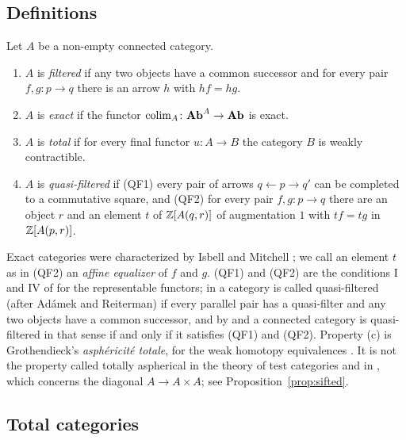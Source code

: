 \subsection{Definitions}

\begin{definition}\label{def:classes}
Let $A$ be a non-empty connected category.
\begin{enumerate}
\item[\textup{(a)}] $A$ is \emph{filtered} if any two objects have a common
 successor and for every pair $f,g\colon p\to q$ there is an arrow $h$ with
 $hf=hg$.
\item[\textup{(b)}] $A$ is \emph{exact} if the functor $\operatorname{colim}_A\colon\mathbf{Ab}^A\to\mathbf{Ab}$ is
 exact.
\item[\textup{(c)}] $A$ is \emph{total} if for every final functor $u\colon A\to B$
 the category $B$ is weakly contractible.
\item[\textup{(d)}] $A$ is \emph{quasi-filtered} if \textup{(QF1)} every pair of
 arrows $q\leftarrow p\to q'$ can be completed to a commutative square, and
 \textup{(QF2)} for every pair $f,g\colon p\to q$ there are an object $r$ and
 an element $t$ of $\mathbb{Z}[A(q,r)]$ of augmentation $1$ with $tf=tg$ in
 $\mathbb{Z}[A(p,r)]$.
\end{enumerate}
\end{definition}

Exact categories were characterized by Isbell and Mitchell
\cite{IM73,IM76}; we call an element $t$ as in (QF2) an \emph{affine
equalizer} of $f$ and $g$. (QF1) and (QF2) are the conditions I and IV of
\cite[\S 2]{IM76} for the representable functors; in \cite[p.~369]{AKR} a
category is called quasi-filtered (after Ad\'amek and Reiterman) if every
parallel pair has a quasi-filter and any two objects have a common successor,
and by \cite[\AKRone]{AKR} and \cite[Lemma~2.1]{IM76} a connected
category is quasi-filtered in that sense if and only if it satisfies (QF1)
and (QF2).
Property (c) is Grothendieck's \emph{asph\'ericit\'e totale}, for the weak
homotopy equivalences \cite[Chapter~II, ms.~p.~36ter; Chapter~XII,
D\'efinition~1]{Der}. It is not the property called totally aspherical in
the theory of test categories and in \cite[Remark~4.5(1)]{Rosicky}, which concerns the
diagonal $A\to A\times A$; see Proposition~\ref{prop:sifted}.

\subsection{Total categories}

